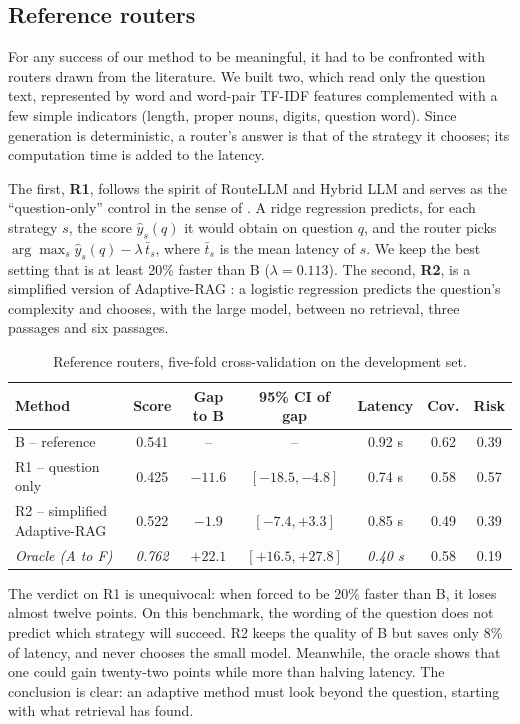 \documentclass[11pt,a4paper]{article}
\begin{document}
\subsection{Reference routers}

For any success of our method to be meaningful, it had to be confronted with routers drawn from the
literature. We built two, which read only the question text, represented by word and word-pair TF-IDF
features complemented with a few simple indicators (length, proper nouns, digits, question word). Since
generation is deterministic, a router's answer is that of the strategy it chooses; its computation time
is added to the latency.

The first, \textbf{R1}, follows the spirit of RouteLLM and Hybrid LLM and serves as the
``question-only'' control in the sense of \citet{li2026beyond}. A ridge regression predicts, for each
strategy $s$, the score $\hat{y}_s(q)$ it would obtain on question $q$, and the router picks
$\arg\max_s \hat{y}_s(q) - \lambda\,\bar{t}_s$, where $\bar{t}_s$ is the mean latency of $s$. We keep
the best setting that is at least 20\% faster than B ($\lambda = 0.113$). The second, \textbf{R2}, is a
simplified version of Adaptive-RAG \citep{jeong2024adaptiverag}: a logistic regression predicts the
question's complexity and chooses, with the large model, between no retrieval, three passages and six
passages.

\begin{table}[H]
\centering\small
\begin{tabular}{l c c c c c c}
\toprule
\textbf{Method} & \textbf{Score} & \textbf{Gap to B} & \textbf{95\% CI of gap} & \textbf{Latency} & \textbf{Cov.} & \textbf{Risk} \\
\midrule
B -- reference & 0.541 & -- & -- & 0.92 s & 0.62 & 0.39 \\
R1 -- question only & 0.425 & $-11.6$ & $[-18.5, -4.8]$ & 0.74 s & 0.58 & 0.57 \\
R2 -- simplified Adaptive-RAG & 0.522 & $-1.9$ & $[-7.4, +3.3]$ & 0.85 s & 0.49 & 0.39 \\
\textit{Oracle (A to F)} & \textit{0.762} & $+22.1$ & $[+16.5, +27.8]$ & \textit{0.40 s} & 0.58 & 0.19 \\
\bottomrule
\end{tabular}
\caption{Reference routers, five-fold cross-validation on the development set.}
\label{tab:routeurs}
\end{table}

The verdict on R1 is unequivocal: when forced to be 20\% faster than B, it loses almost twelve points.
On this benchmark, the wording of the question does not predict which strategy will succeed. R2 keeps
the quality of B but saves only 8\% of latency, and never chooses the small model. Meanwhile, the oracle
shows that one could gain twenty-two points while more than halving latency. The conclusion is clear: an
adaptive method must look beyond the question, starting with what retrieval has found.
\end{document}
